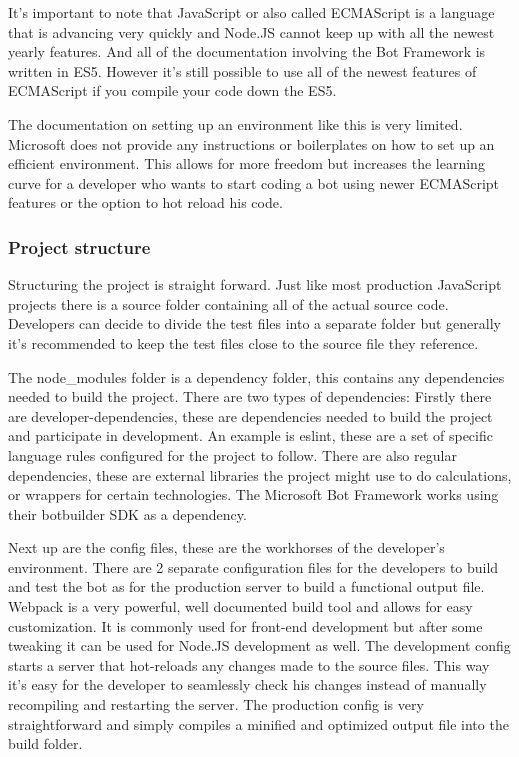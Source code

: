 It's important to note that JavaScript or also called ECMAScript is a language that is advancing very quickly and Node.JS cannot keep up with all the newest yearly features. And all of the documentation involving the Bot Framework is written in ES5. However it's still possible to use all of the newest features of ECMAScript if you compile your code down the ES5.

The documentation on setting up an environment like this is very limited. Microsoft does not provide any instructions or boilerplates on how to set up an efficient environment. This allows for more freedom but increases the learning curve for a developer who wants to start coding a bot using newer ECMAScript features or the option to hot reload his code.

\subsubsection{Project structure}

Structuring the project is straight forward. Just like most production JavaScript projects there is a source folder containing all of the actual source code. Developers can decide to divide the test files into a separate folder but generally it's recommended to keep the test files close to the source file they reference. 

The node\_modules folder is a dependency folder, this contains any dependencies needed to build the project. There are two types of dependencies: Firstly there are developer-dependencies, these are dependencies needed to build the project and participate in development. An example is eslint, these are a set of specific language rules configured for the project to follow. There are also regular dependencies, these are external libraries the project might use to do calculations, or wrappers for certain technologies. The Microsoft Bot Framework works using their botbuilder SDK as a dependency.

Next up are the config files, these are the workhorses of the developer's environment. There are 2 separate configuration files for the developers to build and test the bot as for the production server to build a functional output file. Webpack is a very powerful, well documented build tool and allows for easy customization. It is commonly used for front-end development but after some tweaking it can be used for Node.JS development as well. The development config starts a server that hot-reloads any changes made to the source files. This way it's easy for the developer to seamlessly check his changes instead of manually recompiling and restarting the server. The production config is very straightforward and simply compiles a minified and optimized output file into the build folder.

